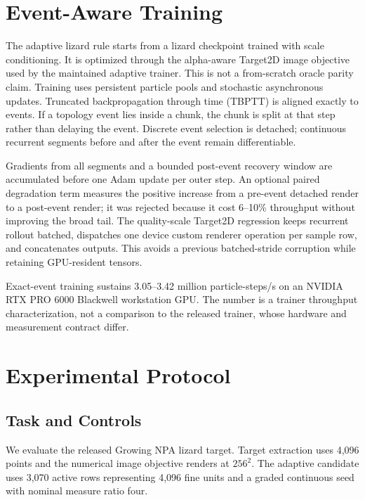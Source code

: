 \documentclass[sigconf,nonacm]{acmart}
\begin{document}
\section{Event-Aware Training}

The adaptive lizard rule starts from a lizard checkpoint trained with scale
conditioning. It is optimized through the alpha-aware Target2D image objective
used by the maintained adaptive trainer. This is not a from-scratch oracle
parity claim. Training uses persistent particle pools and stochastic
asynchronous updates. Truncated backpropagation through time (TBPTT) is aligned
exactly to events. If a topology event lies inside a chunk, the chunk is split at
that step rather than delaying the event. Discrete event selection is detached;
continuous recurrent segments before and after the event remain differentiable.

Gradients from all segments and a bounded post-event recovery window are
accumulated before one Adam update per outer step. An optional paired
degradation term measures the positive increase from a pre-event detached
render to a post-event render; it was rejected because it cost 6--10\%
throughput without improving the broad tail. The quality-scale Target2D
regression keeps recurrent rollout batched, dispatches one device custom
renderer operation per sample row, and concatenates outputs. This avoids a
previous batched-stride corruption while retaining GPU-resident tensors.

Exact-event training sustains 3.05--3.42 million particle-steps/s on an
NVIDIA RTX PRO 6000 Blackwell workstation GPU. The number is a trainer
throughput characterization, not a comparison to the released trainer, whose
hardware and measurement contract differ.

\section{Experimental Protocol}

\subsection{Task and Controls}

We evaluate the released Growing NPA lizard target. Target extraction uses
4,096 points and the numerical image objective renders at $256^2$. The
adaptive candidate uses 3,070 active rows representing 4,096 fine units and a
graded continuous seed with nominal measure ratio four.
\end{document}
